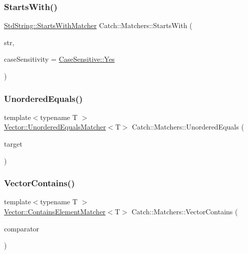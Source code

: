 \subsubsection{\texorpdfstring{StartsWith()}{StartsWith()}}
{\footnotesize\ttfamily \mbox{\hyperlink{struct_catch_1_1_matchers_1_1_std_string_1_1_starts_with_matcher}{Std\+String\+::\+Starts\+With\+Matcher}} Catch\+::\+Matchers\+::\+Starts\+With (\begin{DoxyParamCaption}\item[{std\+::string const \&}]{str,  }\item[{\mbox{\hyperlink{struct_catch_1_1_case_sensitive_aad49d3aee2d97066642fffa919685c6a}{Case\+Sensitive\+::\+Choice}}}]{case\+Sensitivity = {\ttfamily \mbox{\hyperlink{struct_catch_1_1_case_sensitive_aad49d3aee2d97066642fffa919685c6aa7c5550b69ec3c502e6f609b67f9613c6}{Case\+Sensitive\+::\+Yes}}} }\end{DoxyParamCaption})}

\mbox{\label{namespace_catch_1_1_matchers_a3eced3a4f580478f4c5e67ed7e2915df}} 
\subsubsection{\texorpdfstring{UnorderedEquals()}{UnorderedEquals()}}
{\footnotesize\ttfamily template$<$typename T $>$ \\
\mbox{\hyperlink{struct_catch_1_1_matchers_1_1_vector_1_1_unordered_equals_matcher}{Vector\+::\+Unordered\+Equals\+Matcher}}$<$T$>$ Catch\+::\+Matchers\+::\+Unordered\+Equals (\begin{DoxyParamCaption}\item[{std\+::vector$<$ T $>$ const \&}]{target }\end{DoxyParamCaption})}

\mbox{\label{namespace_catch_1_1_matchers_ae8db5846328116fb36386893deaec944}} 
\subsubsection{\texorpdfstring{VectorContains()}{VectorContains()}}
{\footnotesize\ttfamily template$<$typename T $>$ \\
\mbox{\hyperlink{struct_catch_1_1_matchers_1_1_vector_1_1_contains_element_matcher}{Vector\+::\+Contains\+Element\+Matcher}}$<$T$>$ Catch\+::\+Matchers\+::\+Vector\+Contains (\begin{DoxyParamCaption}\item[{T const \&}]{comparator }\end{DoxyParamCaption})}


